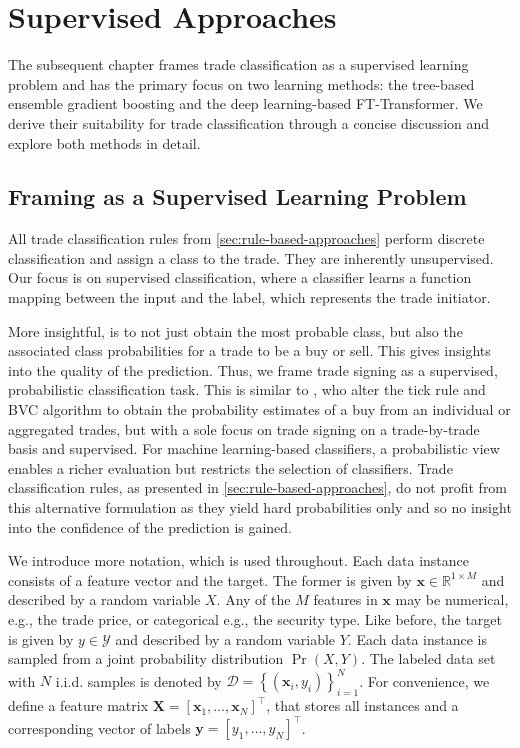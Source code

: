 
\section{Supervised Approaches}\label{sec:supervised-approaches}

The subsequent chapter frames trade classification as a supervised learning problem and has the primary focus on two learning methods: the tree-based ensemble gradient boosting and the deep learning-based FT-Transformer. We derive their suitability for trade classification through a concise discussion and explore both methods in detail.

\subsection{Framing as a Supervised Learning Problem}\label{sec:problem-framing}

All trade classification rules from \cref{sec:rule-based-approaches} perform discrete classification and assign a class to the trade. They are inherently unsupervised. Our focus is on supervised classification, where a classifier learns a function mapping between the input and the label, which represents the trade initiator.

More insightful, is to not just obtain the most probable class, but also the associated class probabilities for a trade to be a buy or sell. This gives insights into the quality of the prediction.
Thus, we frame trade signing as a supervised, probabilistic classification task. This is similar to \textcite[][272]{easleyDiscerningInformationTrade2016}, who alter the tick rule and \gls{BVC} algorithm to obtain the probability estimates of a buy from an individual or aggregated trades, but with a sole focus on trade signing on a trade-by-trade basis and supervised. For machine learning-based classifiers, a probabilistic view enables a richer evaluation but restricts the selection of classifiers. Trade classification rules, as presented in \cref{sec:rule-based-approaches}, do not profit from this alternative formulation as they yield hard probabilities only and so no insight into the confidence of the prediction is gained.

We introduce more notation, which is used throughout. Each data instance consists of a feature vector and the target. The former is given by $\mathbf{x} \in \mathbb{R}^{1 \times M}$ and described by a random variable $X$. Any of the $M$ features in $\mathbf{x}$ may be numerical, e.g., the trade price, or categorical e.g., the security type. Like before, the target is given by $y \in \mathcal{Y}$ and described by a random variable $Y$. Each data instance is sampled from a joint probability distribution $\Pr(X, Y)$. The labeled data set with $N$ i.i.d. samples is denoted by $\mathcal{D} =\left\{\left(\mathbf{x}_i, y_i\right)\right\}_{i=1}^N$. For convenience, we define a feature matrix $\mathbf{X}=\left[\mathbf{x}_1,\ldots, \mathbf{x}_N\right]^{\top}$, that stores all instances and a corresponding vector of labels $\mathbf{y}=\left[y_1,\ldots, y_N \right]^{\top}$.

